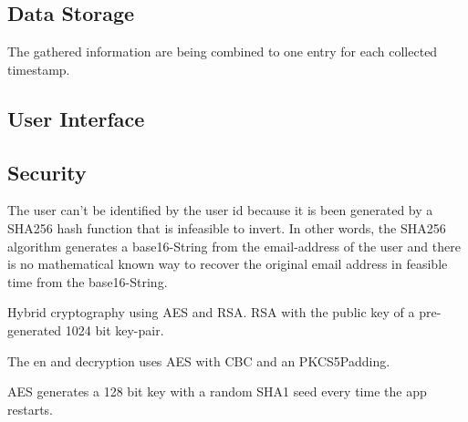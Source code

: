 \subsection{Data Storage}
The gathered information are being combined to one entry for each collected timestamp. 

\subsection{User Interface}

\subsection{Security}
The user can't be identified by the user id because it is been generated by a SHA256 hash function that is infeasible to invert. In other words, the SHA256 algorithm generates a base16-String from the email-address of the user and there is no mathematical known way to recover the original email address in feasible time from the base16-String. 




Hybrid cryptography using AES and RSA. RSA with the public key of a pre-generated 1024 bit key-pair. 

The en and decryption uses AES with CBC and an PKCS5Padding. 



AES generates a 128 bit key with a random SHA1 seed every time the app restarts. 


